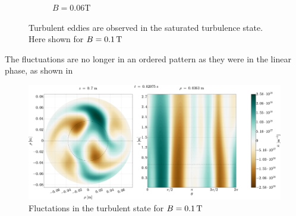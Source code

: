 \begin{figure}[htbp]
\begin{subfigure}[h]{1.00\textwidth}
        \caption{$B=0.06 \text{T}$}
        \label{fig:offcenter}
    \end{subfigure}
    \caption{Turbulent eddies are observed in the saturated turbulence state.
    Here shown for $B=0.1\, \text{T}$}
\end{figure}
%
The fluctuations are no longer in an ordered pattern as they were in the linear phase, as shown in
%
\begin{figure}[htb]
    \centering
    \includegraphics[width=1.0\textwidth]{fig/results/2DTurbulence/fluct}
    \caption{Fluctations in the turbulent state for $B=0.1\, \text{T}$}
    \label{fig:2DFluct}
\end{figure}
%
